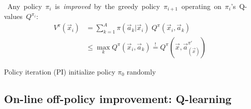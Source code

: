 \begin{frame} \frametitle{\subsecname}
		\vspace{1mm}
		\small
		\mbox{
		\hspace{-4mm}
		Any policy $\pi_i$ is {\em improved} by
			the greedy policy $\pi_{i+1}$ operating on $\pi_i$'s Q-values $Q^{\pi_i}$:}
			\vspace{1mm}	
			\begin{align*}
				V^\pi(\vec x_i) &= \sum_{k=1}^{A} \pi(\vec a_k | \vec x_i) \; Q^\pi(\vec x_i, \vec a_k) \\
				&\leq \max_k Q^\pi(\vec x_i, \vec a_k) \overset{!}{=} Q^\pi \left(\vec x, \vec a^{\pi'}_{(\vec x)} \right)
			\end{align*}
		\normalsize
	\vspace{4mm}
	\begin{block}{Policy iteration (PI)}
		initialize policy $\pi_{0}$ randomly\\
		
		\vspace{-4mm}
		{\footnotesize\hfill\citep[see]%
		[for convergence with estimated Q-values]{Bertsekas07}}
	\end{block}	
\end{frame}

\subsection{On-line off-policy improvement: Q-learning}

